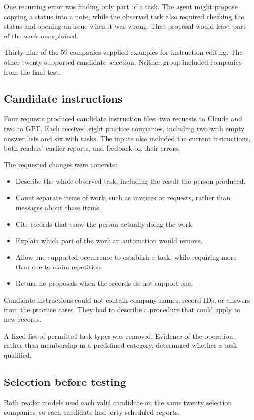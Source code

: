 \documentclass[11pt]{article}
\begin{document}
One recurring error was finding only part of a task. The agent might propose copying a status into a note, while the observed task also required checking the status and opening an issue when it was wrong. That proposal would leave part of the work unexplained.

Thirty-nine of the 59 companies supplied examples for instruction editing. The other twenty supported candidate selection. Neither group included companies from the final test.

\subsection{Candidate instructions}
Four requests produced candidate instruction files: two requests to Claude and two to GPT. Each received eight practice companies, including two with empty answer lists and six with tasks. The inputs also included the current instructions, both readers' earlier reports, and feedback on their errors.

The requested changes were concrete:

\begin{itemize}
\item Describe the whole observed task, including the result the person produced.
\item Count separate items of work, such as invoices or requests, rather than messages about those items.
\item Cite records that show the person actually doing the work.
\item Explain which part of the work an automation would remove.
\item Allow one supported occurrence to establish a task, while requiring more than one to claim repetition.
\item Return no proposals when the records do not support one.
\end{itemize}

Candidate instructions could not contain company names, record IDs, or answers from the practice cases. They had to describe a procedure that could apply to new records.

A fixed list of permitted task types was removed. Evidence of the operation, rather than membership in a predefined category, determined whether a task qualified.

\subsection{Selection before testing}
Both reader models used each valid candidate on the same twenty selection companies, so each candidate had forty scheduled reports.
\end{document}
